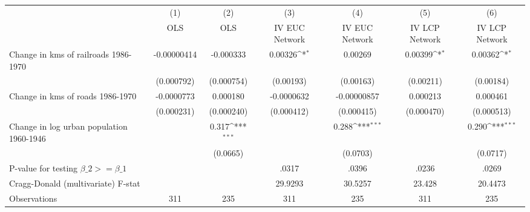 {
\def\sym#1{\ifmmode^{#1}\else\(^{#1}\)\fi}
\begin{tabular}{l*{6}{c}}
\hline\hline
                &\multicolumn{1}{c}{(1)}&\multicolumn{1}{c}{(2)}&\multicolumn{1}{c}{(3)}&\multicolumn{1}{c}{(4)}&\multicolumn{1}{c}{(5)}&\multicolumn{1}{c}{(6)}\\
                &\multicolumn{1}{c}{OLS}&\multicolumn{1}{c}{OLS}&\multicolumn{1}{c}{IV EUC Network}&\multicolumn{1}{c}{IV EUC Network}&\multicolumn{1}{c}{IV LCP Network}&\multicolumn{1}{c}{IV LCP Network}\\
\hline
Change in kms of railroads 1986-1970&-0.00000414         &-0.000333         &  0.00326\sym{*}  &  0.00269         &  0.00399\sym{*}  &  0.00362\sym{*}  \\
                &(0.000792)         &(0.000754)         &(0.00193)         &(0.00163)         &(0.00211)         &(0.00184)         \\
[1em]
Change in kms of roads 1986-1970&-0.0000773         & 0.000180         &-0.0000632         &-0.00000857         & 0.000213         & 0.000461         \\
                &(0.000231)         &(0.000240)         &(0.000412)         &(0.000415)         &(0.000470)         &(0.000513)         \\
[1em]
Change in log urban population 1960-1946&                  &    0.317\sym{***}&                  &    0.288\sym{***}&                  &    0.290\sym{***}\\
                &                  & (0.0665)         &                  & (0.0703)         &                  & (0.0717)         \\
\hline
P-value for testing $\beta\_{2} >= \beta\_{1}$&                  &                  &    .0317         &    .0396         &    .0236         &    .0269         \\
Cragg-Donald (multivariate) F-stat&                  &                  &  29.9293         &  30.5257         &   23.428         &  20.4473         \\
Observations    &      311         &      235         &      311         &      235         &      311         &      235         \\
\hline\hline
\end{tabular}
}
